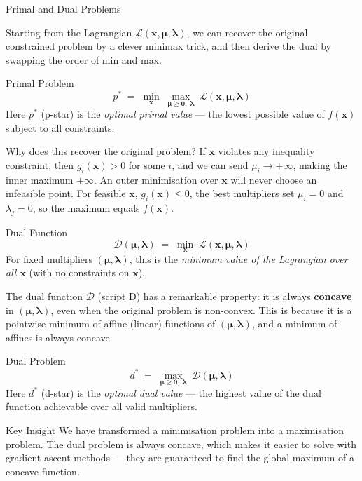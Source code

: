 \documentclass[aspectratio=169,10pt]{beamer}
\newcommand{\bx}{\mathbf{x}}
\newcommand{\bmu}{\boldsymbol{\mu}}
\newcommand{\blam}{\boldsymbol{\lambda}}
\newcommand{\calL}{\mathcal{L}}
\newcommand{\calD}{\mathcal{D}}
\begin{document}
\begin{frame}[allowframebreaks]{Primal and Dual Problems}

  Starting from the Lagrangian $\calL(\bx, \bmu, \blam)$, we can recover the
  original constrained problem by a clever minimax trick, and then derive the
  dual by swapping the order of min and max.

  \begin{block}{Primal Problem}
    \[
      p^* \;=\; \min_{\bx}\; \max_{\bmu \ge \mathbf{0},\;\blam}\;
      \calL(\bx, \bmu, \blam)
    \]
    Here $p^*$ (p-star) is the \emph{optimal primal value} --- the lowest
    possible value of $f(\bx)$ subject to all constraints.
  \end{block}

  Why does this recover the original problem?  If $\bx$ violates any
  inequality constraint, then $g_i(\bx) > 0$ for some $i$, and we can send
  $\mu_i \to +\infty$, making the inner maximum $+\infty$.  An outer
  minimisation over $\bx$ will never choose an infeasible point.  For
  feasible $\bx$, $g_i(\bx) \le 0$, the best multipliers set $\mu_i = 0$
  and $\lambda_j = 0$, so the maximum equals $f(\bx)$.

  \framebreak

  \begin{block}{Dual Function}
    \[
      \calD(\bmu, \blam) \;=\; \min_{\bx}\; \calL(\bx, \bmu, \blam)
    \]
    For fixed multipliers $(\bmu, \blam)$, this is the \emph{minimum value
    of the Lagrangian over all $\bx$} (with no constraints on $\bx$).
  \end{block}

  The dual function $\calD$ (script D) has a remarkable property: it is
  always \textbf{concave} in $(\bmu, \blam)$, even when the original problem
  is non-convex.  This is because it is a pointwise minimum of affine
  (linear) functions of $(\bmu, \blam)$, and a minimum of affines is
  always concave.

  \begin{block}{Dual Problem}
    \[
      d^* \;=\; \max_{\bmu \ge \mathbf{0},\;\blam}\; \calD(\bmu, \blam)
    \]
    Here $d^*$ (d-star) is the \emph{optimal dual value} --- the highest
    value of the dual function achievable over all valid multipliers.
  \end{block}

  \begin{alertblock}{Key Insight}
    We have transformed a minimisation problem into a maximisation problem.
    The dual problem is always concave, which makes it easier to solve with
    gradient ascent methods --- they are guaranteed to find the global maximum
    of a concave function.
  \end{alertblock}

\end{frame}
\end{document}
